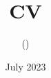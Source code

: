 \documentclass[]{cv}
\title{CV}
\author{\firstname \lastname \postnomial (\pronoun)}
\date{July 2023}
\begin{document}
\leantrue

\end{document}
